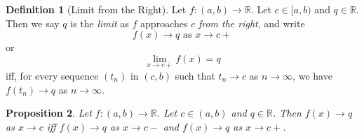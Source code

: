 \documentclass{book}
\newtheorem{prop}{Proposition}[chapter]
\theoremstyle{definition}
\newtheorem{df}[prop]{Definition}
\begin{document}
\begin{df}[Limit from the Right]
Let $f : (a,b) \rightarrow \mathbb{R}$. Let $c \in [a,b)$ and $q \in \mathbb{R}$. Then we say $q$ is the \emph{limit} as $f$ approaches $c$ \emph{from the right}, and write
\[ f(x) \rightarrow q \text{ as } x \rightarrow c+ \]
or
\[ \lim_{x \rightarrow c+} f(x) = q \]
iff, for every sequence $(t_n)$ in $(c,b)$ such that $t_n \rightarrow c$ as $n \rightarrow \infty$, we have $f(t_n) \rightarrow q$ as $n \rightarrow \infty$.
\end{df}

\begin{prop}
Let $f : (a,b) \rightarrow \mathbb{R}$. Let $c \in (a,b)$ and $q \in \mathbb{R}$. Then $f(x) \rightarrow q$ as $x \rightarrow c$ iff $f(x) \rightarrow q$ as $x \rightarrow c-$ and $f(x) \rightarrow q$ as $x \rightarrow c+$.
\end{prop}
\end{document}
